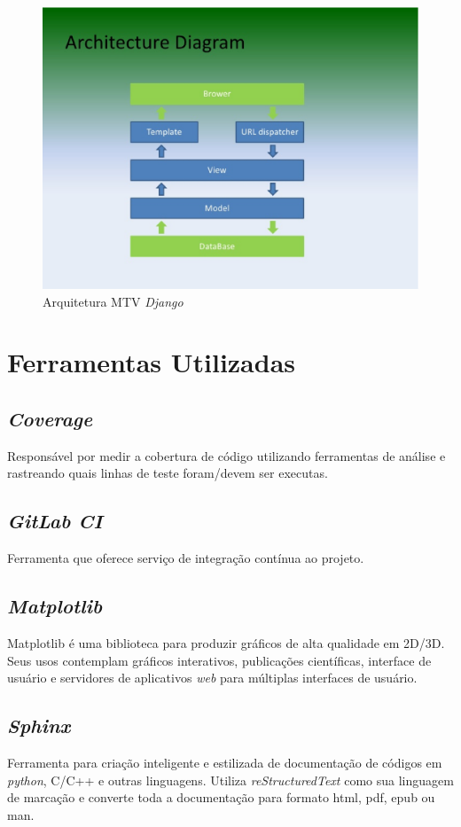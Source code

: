 \begin{figure}[h]
    \centering
    \includegraphics[keepaspectratio=true,scale=0.5]{figuras/django-arquitetura.eps}
    \caption{Arquitetura MTV \textit{Django}}
    \label{django-arq}
\end{figure}

\section{Ferramentas Utilizadas}
    \subsection{\textit{Coverage}}
    Responsável por medir a cobertura de código utilizando ferramentas de análise e rastreando quais
    linhas de teste foram/devem ser executas.

    \subsection{\textit{GitLab CI}}
    Ferramenta que oferece serviço de integração contínua ao projeto.

    \subsection{\textit{Matplotlib}}
    Matplotlib é uma biblioteca para produzir gráficos de alta qualidade em 2D/3D. Seus usos contemplam gráficos interativos, publicações científicas, interface de usuário e servidores de aplicativos \textit{web} para múltiplas interfaces de usuário.

    \subsection{\textit{Sphinx}}
    Ferramenta para criação inteligente e estilizada de documentação de códigos em \textit{python}, C/C++
    e outras linguagens. Utiliza \textit{reStructuredText} como sua linguagem de marcação e converte toda a documentação para formato html, pdf, epub ou man.
